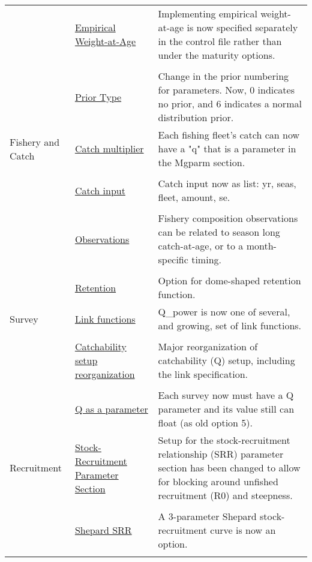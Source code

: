\begin{center}
\begin{longtable}{p{2cm} p{3cm} p{10cm}}
				  \\
				  & \hyperlink{WAAparm} {Empirical Weight-at-Age} & Implementing empirical weight-at-age is now specified separately in the control file rather than under the maturity options.\\
				  \\
				  & \hyperlink{Priors}{Prior Type} & Change in the prior numbering for parameters.  Now, 0 indicates no prior, and 6 indicates a normal distribution prior.\\
				\hline
				Fishery and Catch & 
					\hyperlink{CatchMult}{Catch multiplier} & 
						Each fishing fleet's catch can now have a "q" that is a parameter in the Mgparm section.\\
				  \\						
					& \hyperlink{CatchFormat}{Catch input} & 
						Catch input now as list:  yr, seas, fleet, amount, se. \\
				  \\						
					& \hyperlink{CompTiming}{Observations} & 
						Fishery composition observations can be related to season long catch-at-age, or to a month-specific timing.\\
				  \\					
					& \hyperlink{DomeRetention}{Retention} & 
						Option for dome-shaped retention function. \\
				\hline
				Survey  
					& \hyperlink{Qsetup}{Link functions} & 
						Q\_power is now one of several, and growing, set of link functions. \\
				  \\						
					& \hyperlink{Qsetup}{Catchability setup reorganization} & 
						Major reorganization of catchability (Q) setup, including the link specification. \\
				  \\					
					& \multicolumn{1}{l}{\hyperlink{Qsetup}{Q as a parameter}} & 
						Each survey now must have a Q parameter and its value still can float (as old option 5).\\
				\hline
				Recruitment
					& \hyperlink{SRR}{Stock-Recruitment Parameter Section} & Setup for the stock-recruitment relationship (SRR) parameter section has been changed to allow for blocking around unfished recruitment (R0) and steepness.\\ 
					\\
					& \hyperlink{Shepard}{Shepard SRR} & 
						A 3-parameter Shepard stock-recruitment curve is now an option.\\
					\\

\end{longtable}
\end{center}
